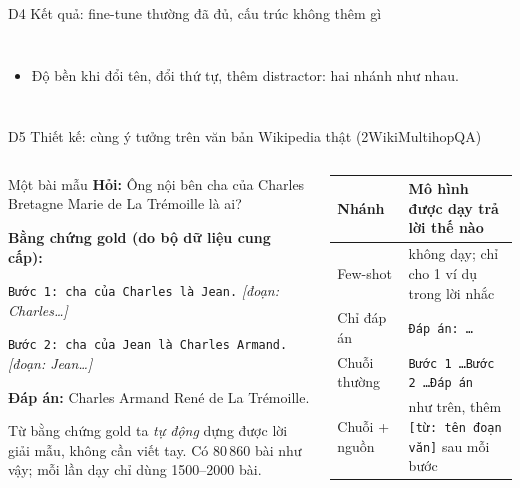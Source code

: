 \documentclass[aspectratio=169,t]{beamer}
\newcommand{\code}[1]{\texttt{#1}}
\begin{document}
\begin{frame}[shrink]{D4 \textperiodcentered{} Kết quả: fine-tune thường đã đủ, cấu trúc không thêm gì}
\begin{columns}[T,onlytextwidth]
\begin{itemize}
  \item Độ bền khi đổi tên, đổi thứ tự, thêm distractor: hai nhánh như nhau.
\end{itemize}
\end{columns}
\par\kern0pt
\end{frame}

\begin{frame}[shrink]{D5 \textperiodcentered{} Thiết kế: cùng ý tưởng trên văn bản Wikipedia thật (2WikiMultihopQA)}
\begin{columns}[T,onlytextwidth]
\begin{block}{Một bài mẫu}
\scriptsize
\textbf{Hỏi:} Ông nội bên cha của Charles Bretagne Marie de La Trémoille là ai?\par\vspace{2pt}
\textbf{Bằng chứng gold (do bộ dữ liệu cung cấp):}\par
\code{Bước 1: cha của Charles là Jean.} \emph{[đoạn: Charles\ldots]}\par
\code{Bước 2: cha của Jean là Charles Armand.} \emph{[đoạn: Jean\ldots]}\par\vspace{2pt}
\textbf{Đáp án:} Charles Armand René de La Trémoille.\par\vspace{2pt}
Từ bằng chứng gold ta \emph{tự động} dựng được lời giải mẫu, không cần viết tay. Có 80\,860 bài như vậy; mỗi lần dạy chỉ dùng 1500--2000 bài.
\end{block}
\scriptsize
\renewcommand{\arraystretch}{1.18}
\begin{tabularx}{\linewidth}{@{}P{1.55cm}Y@{}}
\toprule
\textbf{Nhánh} & \textbf{Mô hình được dạy trả lời thế nào}\\
\midrule
Few-shot & không dạy; chỉ cho 1 ví dụ trong lời nhắc\\
Chỉ đáp án & \code{Đáp án: \ldots}\\
Chuỗi thường & \code{Bước 1 \ldots Bước 2 \ldots Đáp án}\\
Chuỗi + nguồn & như trên, thêm \code{[từ: tên đoạn văn]} sau mỗi bước\\

\end{tabularx}
\end{columns}
\end{frame}
\end{document}
